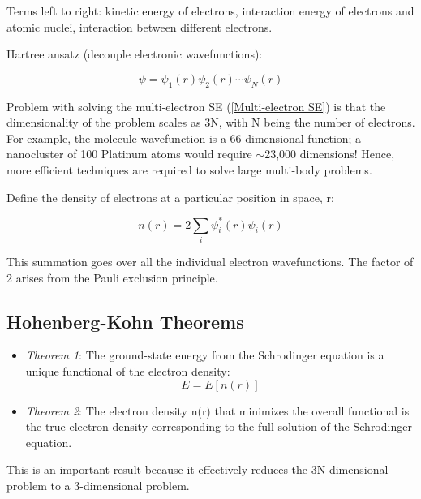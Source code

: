 \documentclass[]{article}
\begin{document}
Terms left to right: kinetic energy of electrons, interaction energy of electrons and atomic nuclei, interaction between different electrons. \newline

Hartree ansatz (decouple electronic wavefunctions):

\begin{equation}
\psi = \psi_1(r)\psi_2(r)\cdots\psi_N(r)
\end{equation}

Problem with solving the multi-electron SE (\ref{Multi-electron SE}) is that the dimensionality of the problem scales as 3N, with N being the number of electrons. For example, the  molecule wavefunction is a 66-dimensional function; a nanocluster of 100 Platinum atoms would require $\sim$23,000 dimensions! Hence, more efficient techniques are required to solve large multi-body problems. 
\newline

Define the density of electrons at a particular position in space, r:

\begin{equation}
n(r) = 2\sum_{i} \psi_{i}^{*}(r)\psi_{i}(r)
\end{equation}

This summation goes over all the individual electron wavefunctions. The factor of 2 arises from the Pauli exclusion principle.


\subsection{Hohenberg-Kohn Theorems}

\begin{itemize}
	\item \textit{Theorem 1}:
	The ground-state energy from the Schrodinger equation is a unique functional of the electron density:
	\begin{equation}
	E = E[n(r)]
	\end{equation}
	
	\item \textit{Theorem 2}:
	The electron density n(r) that minimizes the overall functional is the true electron density corresponding to the full solution of the Schrodinger equation.
\end{itemize}

This is an important result because it effectively reduces the 3N-dimensional problem to a 3-dimensional problem.
\newline
\end{document}
